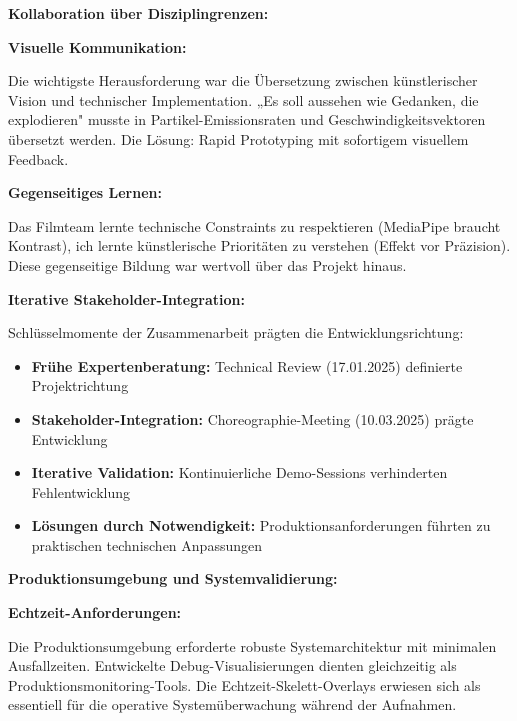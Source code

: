 \textbf{Kollaboration über Disziplingrenzen:}

\textbf{Visuelle Kommunikation:}

\raggedright Die wichtigste Herausforderung war die Übersetzung zwischen künstlerischer Vision und technischer Implementation. „Es soll aussehen wie Gedanken, die explodieren" musste in Partikel-Emissionsraten und Geschwindigkeitsvektoren übersetzt werden. Die Lösung: Rapid Prototyping mit sofortigem visuellem Feedback.

\textbf{Gegenseitiges Lernen:}

\raggedright Das Filmteam lernte technische Constraints zu respektieren (MediaPipe braucht Kontrast), ich lernte künstlerische Prioritäten zu verstehen (Effekt vor Präzision). Diese gegenseitige Bildung war wertvoll über das Projekt hinaus.

\textbf{Iterative Stakeholder-Integration:}

Schlüsselmomente der Zusammenarbeit prägten die Entwicklungsrichtung:
\begin{itemize}
\item \textbf{Frühe Expertenberatung:} Technical Review (17.01.2025) definierte Projektrichtung
\item \textbf{Stakeholder-Integration:} Choreographie-Meeting (10.03.2025) prägte Entwicklung
\item \textbf{Iterative Validation:} Kontinuierliche Demo-Sessions verhinderten Fehlentwicklung
\item \textbf{Lösungen durch Notwendigkeit:} Produktionsanforderungen führten zu praktischen technischen Anpassungen
\end{itemize}

\textbf{Produktionsumgebung und Systemvalidierung:}

\textbf{Echtzeit-Anforderungen:}

\raggedright Die Produktionsumgebung erforderte robuste Systemarchitektur mit minimalen Ausfallzeiten. Entwickelte Debug-Visualisierungen dienten gleichzeitig als Produktionsmonitoring-Tools. Die Echtzeit-Skelett-Overlays erwiesen sich als essentiell für die operative Systemüberwachung während der Aufnahmen.

